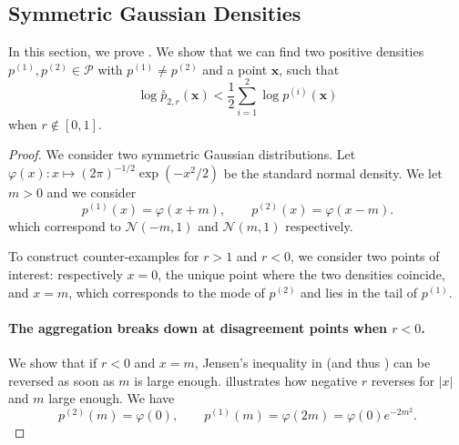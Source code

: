 \documentclass[accepted]{uai2026} %
\newcommand{\vx}{\mathbf{x}}
\newcommand{\compose}[1]{\overset{\circ}{#1}}
\begin{document}
\subsection{Symmetric Gaussian Densities}\label{app: symmetric gaussians counterexample}
In this section, we prove . We show that we can find two positive densities
$p^{(1)}, p^{(2)} \in \mathcal{P}$ with $p^{(1)} \neq p^{(2)}$
and a point $\vx$, such that
\begin{equation}\label{eq: bad inequality likelihood appendix}
\log \compose{p}_{2,r}(\vx)<\frac{1}{2} \sum_{i=1}^2 \log p^{(i)}(\vx)
\end{equation}
when $r \notin [0,1]$.


\begin{proof}

We consider two symmetric Gaussian distributions. Let $\varphi(x):x \mapsto  (2\pi)^{-1/2} \exp(-x^2/2)$ be the standard normal density. We let $m > 0$ and we consider
\begin{equation}
p^{(1)}(x) = \varphi(x+m), 
\qquad 
p^{(2)}(x) = \varphi(x-m).
\end{equation}
which correspond to $\mathcal{N}(-m,1)$ and $\mathcal{N}(m,1)$ respectively.

To construct counter-examples for $r>1$ and $r<0$, we consider two points of interest: respectively $x=0$, the unique point where the two densities coincide, and $x=m$, which corresponds to the mode of $p^{(2)}$ and lies in the tail of $p^{(1)}$.

\paragraph{The aggregation breaks down at disagreement points when $r < 0$.} We show that if $r<0$ and $x=m$, Jensen's inequality in  (and thus ) can be reversed as soon as $m$ is large enough.  illustrates how negative $r$ reverses  for $|x|$ and $m$ large enough. We have
\begin{equation}
p^{(2)}(m)=\varphi(0),
\qquad
p^{(1)}(m)=\varphi(2m)=\varphi(0)e^{-2m^2}.
\end{equation}


\end{proof}
\end{document}
